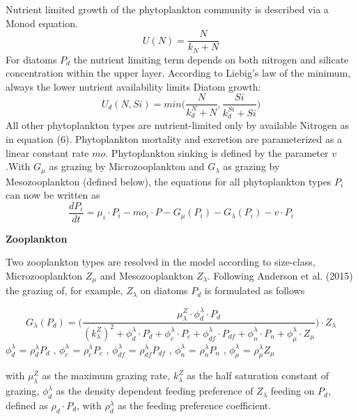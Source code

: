 Nutrient limited growth of the phytoplankton community is described via a Monod equation. 
\begin{equation}
U(N) = \frac{N} {k_N + N}
\end{equation}
For diatoms $P_d$ the nutrient limiting term depends on both nitrogen and silicate concentration within the upper layer. According to Liebig's law of the minimum, always the lower nutrient availability limits Diatom growth:
\begin{equation}
U_{d}(N,Si) = min \Big( \frac{N} {k_{d}^N + N}, \frac{Si} {k_{d}^{Si} + Si} \Big)
\end{equation}
All other phytoplankton types are nutrient-limited only by available Nitrogen as in equation (6). Phytoplankton mortality and excretion are parameterized as a linear constant rate $mo$. Phytoplankton sinking is defined by the parameter $v$.With $G_{\mu}$ as grazing by Microzooplankton and $G_{\lambda}$ as grazing by Mesozooplankton (defined below), the equations for all phytoplankton types $P_i$ can now be written as
\begin{equation}
\frac{dP_{i}}{dt} = \mu_{i} \cdot P_{i} - mo_{i} \cdot P - G_{\mu}(P_{i}) - G_{\lambda}(P_{i}) - v \cdot P_{i}
\end{equation}

{\bf {Zooplankton}}

Two zooplankton types are resolved in the model according to size-class, Microzooplankton $Z_{\mu}$ and Mesozooplankton $Z_{\lambda}$. Following Anderson et al. (2015) the grazing of, for example, $Z_{\lambda}$ on diatoms $P_d$ is formulated as follows

\begin{equation}
G_{\lambda}(P_{d}) = \Bigg( \frac{\mu^Z_{\lambda} \cdot \phi^{\lambda}_d \cdot P_d} 
							{(k^Z_{\lambda})^2 + \phi^{\lambda}_d \cdot P_d + \phi^{\lambda}_c \cdot P_c + \phi^{\lambda}_{df} \cdot P_{df} + \phi^{\lambda}_{n} \cdot P_{n} + \phi^{\lambda}_{\mu} \cdot Z_{\mu}} \Bigg) \cdot Z_{\lambda}
\end{equation}
$\phi^{\lambda}_{d}$ = $\rho^{\lambda}_{d} P_{d}$ , $\phi^{\lambda}_{c}$ = $\rho^{\lambda}_{c} P_{c}$ , $\phi^{\lambda}_{df}$ = $\rho^{\lambda}_{df} P_{df}$ , $\phi^{\lambda}_{n}$ = $\rho^{\lambda}_{n} P_{n}$ , $\phi^{\lambda}_{\mu}$ = $\rho^{\lambda}_{\mu} Z_{\mu}$

with $\mu^Z_{\lambda}$ as the maximum grazing rate, $k^Z_{\lambda}$ as the half saturation constant of grazing, $\phi^{\lambda}_{d}$ as the density dependent feeding preference of $Z_{\lambda}$ feeding on $P_d$, defined as $\rho_{d} \cdot P_{d}$, with $\rho^{\lambda}_{d}$ as the feeding preference coefficient.



